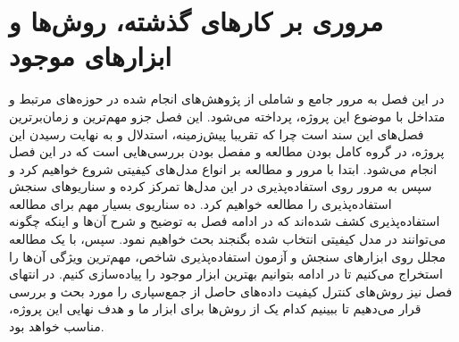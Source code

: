 \chapter{مروری بر کارهای گذشته، روش‌ها و ابزارهای موجود}
در این فصل به مرور جامع و شاملی از پژوهش‌های انجام شده در حوزه‌های مرتبط و متداخل با موضوع این پروژه، پرداخته می‌شود. این فصل جزو مهم‌ترین و زمان‌برترین فصل‌های این سند است چرا که تقریبا پیش‌زمینه، استدلال و به نهایت رسیدن این پروژه، در گروه کامل بودن مطالعه و مفصل بودن بررسی‌هایی است که در این فصل انجام می‌شود. ابتدا با مرور و مطالعه بر انواع مدل‌های کیفیتی شروع خواهیم کرد و سپس به مرور روی استفاده‌پذیری در این مدل‌ها تمرکز کرده و سناریوهای سنجش استفاده‌پذیری را مطالعه خواهیم کرد. ده سناریوی بسیار مهم برای مطالعه استفاده‌پذیری کشف شده‌اند که در ادامه فصل به توضیح و شرح آن‌ها و اینکه چگونه می‌توانند در مدل کیفیتی انتخاب شده بگنجند بحث خواهیم نمود. سپس، با یک مطالعه مجلل روی ابزارهای سنجش و آزمون استفاده‌پذیری شاخص، مهم‌ترین ویژگی آن‌ها را استخراج می‌کنیم تا در ادامه بتوانیم بهترین ابزار موجود را پیاده‌سازی کنیم. در انتهای فصل نیز روش‌های کنترل کیفیت داده‌های حاصل از جمع‌سپاری را مورد بحث و بررسی قرار می‌دهیم تا ببینیم کدام یک از روش‌ها برای ابزار ما و هدف نهایی این پروژه، مناسب خواهد بود.
